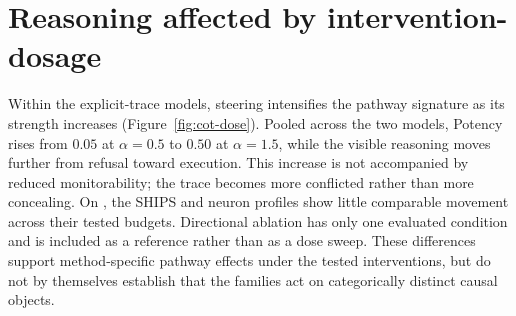 \begin{table}[t]
  \centering
  \scriptsize
  \setlength{\tabcolsep}{3pt}
  \caption{Full pathway-label rates for  on
  JailbreakBench, measured over parsed cumulative trace prefixes. Columns compare
  the baseline with the strongest evaluated condition from each family.}
  \label{tab:appendix-pathway}
\end{table}

\section{Reasoning affected by intervention-dosage}
\label{sec:appendix:dosage}
Within the explicit-trace models, steering intensifies the pathway signature as
its strength increases (Figure~\ref{fig:cot-dose}). Pooled across the two models,
Potency rises from $0.05$ at $\alpha=0.5$ to $0.50$ at $\alpha=1.5$, while the
visible reasoning moves further from refusal toward execution. This increase is
not accompanied by reduced monitorability; the trace becomes more conflicted
rather than more concealing. On , the SHIPS and neuron
profiles show little comparable movement across their tested budgets.
Directional ablation has only one evaluated condition and is included as a
reference rather than as a dose sweep. These differences support
method-specific pathway effects under the tested interventions, but do not by
themselves establish that the families act on categorically distinct causal
objects.


